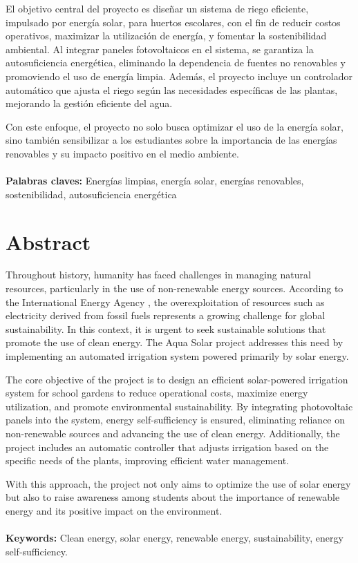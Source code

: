 \documentclass[12pt]{article}
\begin{document}
El objetivo central del proyecto es diseñar un sistema de riego eficiente, impulsado por energía solar, para huertos escolares, con el fin de reducir costos operativos, maximizar la utilización de energía, y fomentar la sostenibilidad ambiental. Al integrar paneles fotovoltaicos en el sistema, se garantiza la autosuficiencia energética, eliminando la dependencia de fuentes no renovables y promoviendo el uso de energía limpia. Además, el proyecto incluye un controlador automático que ajusta el riego según las necesidades específicas de las plantas, mejorando la gestión eficiente del agua.

Con este enfoque, el proyecto no solo busca optimizar el uso de la energía solar, sino también sensibilizar a los estudiantes sobre la importancia de las energías renovables y su impacto positivo en el medio ambiente.
\\~\\
\textbf{Palabras claves:} Energías limpias, energía solar, energías renovables, sostenibilidad, autosuficiencia energética
\newpage
\section*{Abstract}
Throughout history, humanity has faced challenges in managing natural resources, particularly in the use of non-renewable energy sources. According to the International Energy Agency \cite{IEA2020}, the overexploitation of resources such as electricity derived from fossil fuels represents a growing challenge for global sustainability. In this context, it is urgent to seek sustainable solutions that promote the use of clean energy. The Aqua Solar project addresses this need by implementing an automated irrigation system powered primarily by solar energy.

The core objective of the project is to design an efficient solar-powered irrigation system for school gardens to reduce operational costs, maximize energy utilization, and promote environmental sustainability. By integrating photovoltaic panels into the system, energy self-sufficiency is ensured, eliminating reliance on non-renewable sources and advancing the use of clean energy. Additionally, the project includes an automatic controller that adjusts irrigation based on the specific needs of the plants, improving efficient water management.

With this approach, the project not only aims to optimize the use of solar energy but also to raise awareness among students about the importance of renewable energy and its positive impact on the environment.
\\~\\
\textbf{Keywords:} Clean energy, solar energy, renewable energy, sustainability, energy self-sufficiency.
\newpage
\renewcommand{\contentsname}{Tabla de Contenido}
\tableofcontents
\end{document}
